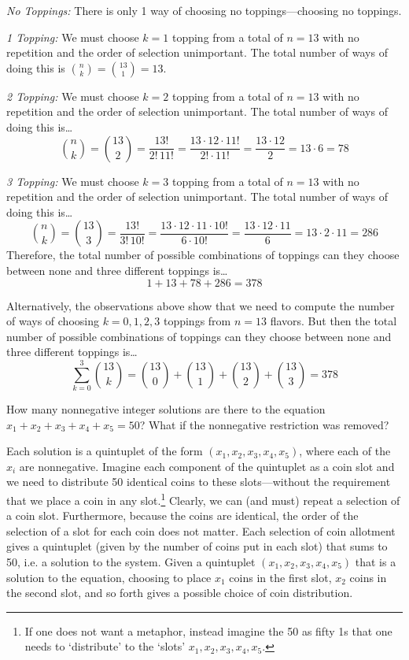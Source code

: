 \documentclass[11pt,letterpaper]{article}
\begin{document}
{\itshape No Toppings:} There is only 1 way of choosing no toppings---choosing no toppings. \pspace

{\itshape 1 Topping:} We must choose $k= 1$ topping from a total of $n= 13$ with no repetition and the order of selection unimportant. The total number of ways of doing this is $\binom{n}{k}= \binom{13}{1}= 13$. \pspace

{\itshape 2 Topping:} We must choose $k= 2$ topping from a total of $n= 13$ with no repetition and the order of selection unimportant. The total number of ways of doing this is\dots
	\[
	\binom{n}{k}= \binom{13}{2}= \dfrac{13!}{2! \, 11!}= \dfrac{13 \cdot 12 \cdot 11!}{2! \cdot 11!}= \dfrac{13 \cdot 12}{2}= 13 \cdot 6= 78
	\]  \pspace

{\itshape 3 Topping:} We must choose $k= 3$ topping from a total of $n= 13$ with no repetition and the order of selection unimportant. The total number of ways of doing this is\dots
	\[
	\binom{n}{k}= \binom{13}{3}= \dfrac{13!}{3! \, 10!}= \dfrac{13 \cdot 12 \cdot 11 \cdot 10!}{6 \cdot 10!}= \dfrac{13 \cdot 12 \cdot 11}{6}= 13 \cdot 2 \cdot 11= 286
	\]  \pspace
Therefore, the total number of possible combinations of toppings can they choose between none and three different toppings is\dots
	\[
	1 + 13 + 78 + 286= 378
	\] \pspace

Alternatively, the observations above show that we need to compute the number of ways of choosing $k= 0, 1, 2, 3$ toppings from $n= 13$ flavors. But then the total number of possible combinations of toppings can they choose between none and three different toppings is\dots
	\[
	\sum_{k= 0}^3 \binom{13}{k}= \binom{13}{0} + \binom{13}{1} + \binom{13}{2} + \binom{13}{3}= 378
	\]



\newpage



 How many nonnegative integer solutions are there to the equation $x_1 + x_2 + x_3 + x_4 + x_5= 50$? What if the nonnegative restriction was removed? \pspace

\sol Each solution is a quintuplet of the form $(x_1, x_2, x_3, x_4, x_5)$, where each of the $x_i$ are nonnegative. Imagine each component of the quintuplet as a coin slot and we need to distribute 50 identical coins to these slots---without the requirement that we place a coin in any slot.\footnote{If one does not want a metaphor, instead imagine the 50 as fifty 1s that one needs to `distribute' to the `slots' $x_1, x_2, x_3, x_4, x_5$.} Clearly, we can (and must) repeat a selection of a coin slot. Furthermore, because the coins are identical, the order of the selection of a slot for each coin does not matter. Each selection of coin allotment gives a quintuplet (given by the number of coins put in each slot) that sums to 50, i.e. a solution to the system. Given a quintuplet $(x_1, x_2, x_3, x_4, x_5)$ that is a solution to the equation, choosing to place $x_1$ coins in the first slot, $x_2$ coins in the second slot, and so forth gives a possible choice of coin distribution. \pspace
\end{document}
